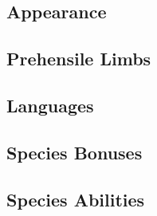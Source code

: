 {\subsection*{Appearance}

\subsection*{Prehensile Limbs}

\subsection*{Languages}

\subsection*{Species Bonuses}

\subsection*{Species Abilities}

}